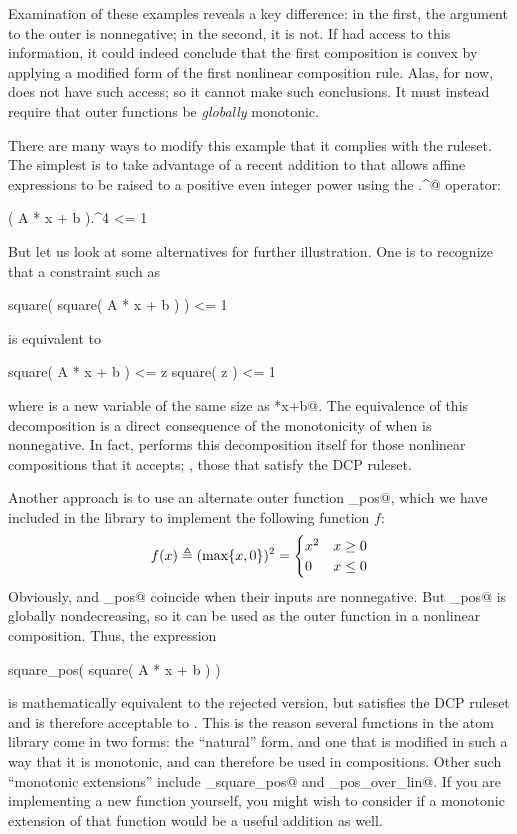 \documentclass[12pt]{article}
\begin{document}
Examination of these examples reveals a key difference:
in the first, the argument to the outer \verb@square@ is nonnegative;
in the second, it is not. If \cvx had access to this information, it could
indeed conclude that the first composition is convex by applying a
modified form of the first nonlinear composition rule.
Alas, for now, \cvx does not have such access; so it cannot make
such conclusions.
It must instead require
that outer functions be \emph{globally} monotonic.

There are many ways to modify this example that it complies with the ruleset.
The simplest is to take advantage of a recent addition to \cvx that allows
affine expressions to be raised
to a positive even integer power using the \verb@.^@ operator:
\begin{code}
	( A * x + b ).^4 <= 1
\end{code}
But let us look at some alternatives for further illustration.
One is to recognize that a constraint such as
\begin{code}
	square( square( A * x + b ) ) <= 1
\end{code}
is equivalent to
\begin{code}
	square( A * x + b ) <= z
	square( z ) <= 1
\end{code}
where \verb@z@ is a new variable of the same size as \verb@A*x+b@.
The equivalence of this decomposition
is a direct consequence of the monotonicity of 
\verb@square@ when \verb@z@
is nonnegative. In fact, \cvx performs this decomposition itself for
those nonlinear compositions that it accepts; \ie, those that
satisfy the DCP ruleset.

Another approach is to use an alternate outer function 
\verb@square_pos@,
which we have included in the library to implement
the following function $f$:
\begin{equation*}
	f(x) \triangleq (\max\{x,0\})^2 = \begin{cases}  x^2 & x \geq 0 \\ 0 & x \leq 0  \end{cases}
\end{equation*}
Obviously, \verb@square@ and \verb@square_pos@ coincide when their
inputs are nonnegative. But \verb@square_pos@ is globally nondecreasing, so it
can be used as the outer function in a nonlinear composition. Thus, the expression
\begin{code}
	square_pos( square( A * x + b ) )
\end{code}
is mathematically equivalent to the rejected version, but satisfies the DCP
ruleset and is therefore acceptable to \cvx.
This is the reason several functions in the \cvx atom library come in two
forms: the ``natural'' form, and one that is modified in such a way 
that it is monotonic, and can therefore 
be used in compositions. Other such ``monotonic extensions''
include \verb@sum_square_pos@ and \verb@quad_pos_over_lin@. If you are
implementing a new function yourself, you might wish to consider if
a monotonic extension of that function would be a useful addition as well.
\end{document}
